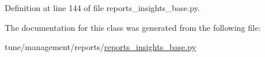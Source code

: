 Definition at line 144 of file reports\-\_\-insights\-\_\-base.\-py.



The documentation for this class was generated from the following file\-:\begin{DoxyCompactItemize}
\item 
tune/management/reports/\hyperlink{reports__insights__base_8py}{reports\-\_\-insights\-\_\-base.\-py}\end{DoxyCompactItemize}
